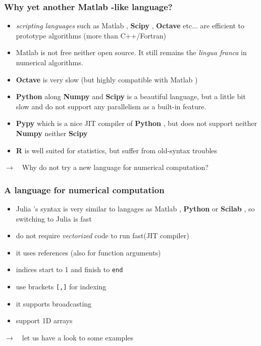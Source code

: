 \documentclass[11pt,mathserif]{beamer}
\newcommand{\fleche}{\alert{$\pmb{\longrightarrow}$}~~}
\newcommand{\scipy}{\textbf{Scipy}{} }
\newcommand{\numpy}{\textbf{Numpy}{} }
\newcommand{\julia}{{ Julia}{} }
\newcommand{\matlab}{{ Matlab}{} }
\newcommand{\octave}{\textbf{Octave}{} }
\newcommand{\scilab}{\textbf{Scilab}{} }
\newcommand{\python}{\textbf{Python}{} }
\begin{document}
\begin{frame}
  \frametitle{Why yet another \matlab-like language?}
  \begin{itemize}[<+->]
    \item {\em scripting languages} such as \matlab, \scipy, \octave etc... are
    efficient to prototype algorithms (more than C++/Fortran)
    \item \matlab is not free neither open source. It still remains the {\em lingua franca}
    in numerical algorithms. 
    \item \octave is very slow (but highly compatible with \matlab)
    \item \python along \numpy and \scipy is a beautiful language, but a little bit slow and do not
    support any parallelism as a built-in feature. 
    \item \textbf{Pypy} which is a nice JIT compiler of \python, but does not support neither \numpy neither \scipy
    \item \textbf{R} is well suited for statistics, but suffer from old-syntax troubles
  \end{itemize}
  \pause
  \fleche Why do not try a new language for numerical computation?
\end{frame}



\begin{frame}[fragile]
  \frametitle{A language for numerical computation}
  \begin{itemize}[<+->]
    \item \julia's syntax is very similar to langages as \matlab, \python or \scilab, so
    switching to \julia is fast
    \item do not require {\em vectorized} code to run fast(JIT compiler)
    \item it uses references (also for function arguments)
    \item indices start to 1 and finish to \texttt{end}
    \item use brackets \texttt{[,]} for indexing
    \item it supports broadcasting
    \item support 1D arrays
  \end{itemize}
  \pause
  \fleche let us have a look to some examples
\end{frame}
\end{document}
